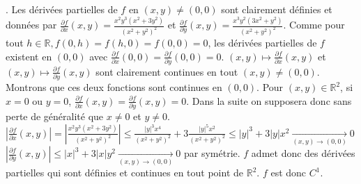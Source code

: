 \documentclass{report}
\begin{document}
\subsection{} \noindent{}\\ 
\\ 
\\
. Les dérivées partielles de $f$ en $(x,y)\neq (0,0)$ sont clairement définies et données par $\frac{\partial f}{\partial x}(x,y)=\frac{x^2 y^3 \left(x^2+3 y^2\right)}{\left(x^2+y^2\right)^2}$ et $\frac{\partial f}{\partial y}(x,y)= \frac{x^3 y^2 \left(3 x^2+y^2\right)}{\left(x^2+y^2\right)^2}$. 
\newline
Comme pour tout $h\in \mathbb R, f(0,h)=f(h,0)=f(0,0)=0$, les dérivées partielles de $f$ existent en $(0,0)$ avec $\frac{\partial f}{\partial x}(0,0)=\frac{\partial f}{\partial y}(0,0)=0$.\newline
\newline
$(x,y)\mapsto \frac{\partial f}{\partial x}(x,y)$ et $(x,y)\mapsto \frac{\partial f}{\partial y}(x,y)$ sont clairement continues en tout $(x,y)\neq (0,0)$.
Montrons que ces deux fonctions sont continues en $(0,0)$.\newline
Pour $(x,y)\in \mathbb R^2$, si $x=0$ ou $y=0$, $\frac{\partial f}{\partial x}(x,y)=\frac{\partial f}{\partial y}(x,y)=0$. Dans la suite on supposera donc sans perte de généralité que $x\neq 0$ et $y\neq 0$.\newline
$\left| \frac{\partial f}{\partial x}(x,y)\right| =\left|\frac{x^2 y^3 \left(x^2+3 y^2\right)}{\left(x^2+y^2\right)^2}\right|\leq \frac{|y|^3x^4}{(x^2+y^2)^2} + 3\frac{|y|^5x^2}{(x^2+y^2)^2}\leq |y|^3+3|y|x^2 \xrightarrow[(x,y)\to (0,0)]{}0$\newline
$\left| \frac{\partial f}{\partial y}(x,y)\right| \leq |x|^3+3|x|y^2 \xrightarrow[(x,y)\to (0,0)]{}0$ par symétrie.\newline
$f$ admet donc des dérivées partielles qui sont définies et continues en tout point de $\mathbb R^2$. $f$ est donc $C^1$. \newline
\newline
\end{document}
